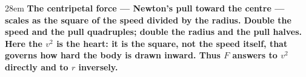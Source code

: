 \documentclass[border=4pt]{standalone}
\begin{document}
\begin{varwidth}{28em}
\large\bfseries
The centripetal force — Newton's pull toward the centre — scales as the square of the speed divided by the radius. Double the speed and the pull quadruples; double the radius and the pull halves. Here the $v^2$ is the heart: it is the square, not the speed itself, that governs how hard the body is drawn inward. Thus $F$ answers to $v^2$ directly and to $r$ inversely.
\end{varwidth}
\end{document}
